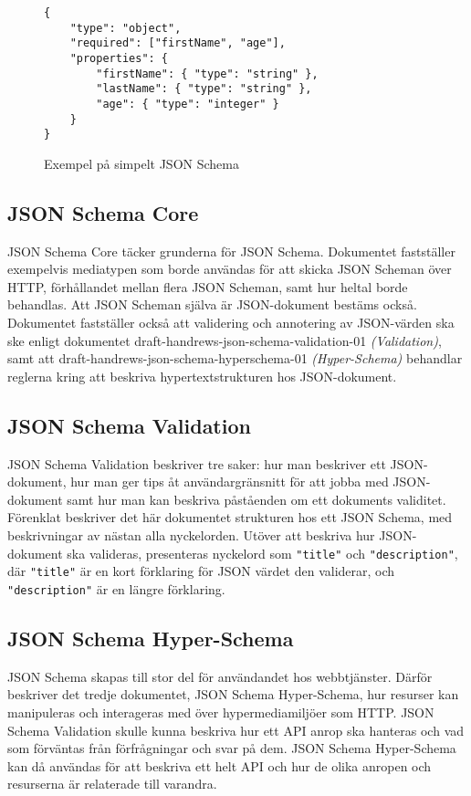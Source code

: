 \begin{figure}
	\begin{verbatim}
{
	"type": "object",
	"required": ["firstName", "age"],
	"properties": {
		"firstName": { "type": "string" },
		"lastName": { "type": "string" },
		"age": { "type": "integer" }
	}
}
	\end{verbatim}
	\vspace{-1.7em}
	\caption{Exempel på simpelt JSON Schema}
	\label{fig:json-schema-example}
\end{figure}

\subsection{JSON Schema Core}
JSON Schema Core täcker grunderna för JSON Schema. Dokumentet fastställer exempelvis mediatypen som borde användas för att skicka JSON Scheman över HTTP, förhållandet mellan flera JSON Scheman, samt hur heltal borde behandlas. Att JSON Scheman själva är JSON-dokument bestäms också. Dokumentet fastställer också att validering och annotering av JSON-värden ska ske enligt dokumentet draft-handrews-json-schema-validation-01 \textit{(Validation)}, samt att draft-handrews-json-schema-hyperschema-01 \textit{(Hyper-Schema)} behandlar reglerna kring att beskriva hypertextstrukturen hos JSON-dokument. \cite{A.Wright}

\subsection{JSON Schema Validation}
JSON Schema Validation beskriver tre saker: hur man beskriver ett JSON-dokument, hur man ger tips åt användargränsnitt för att jobba med JSON-dokument samt hur man kan beskriva påståenden om ett dokuments validitet. Förenklat beskriver det här dokumentet strukturen hos ett JSON Schema, med beskrivningar av nästan alla nyckelorden. Utöver att beskriva hur JSON-dokument ska valideras, presenteras nyckelord som \texttt{"title"} och \texttt{"description"}, där \texttt{"title"} är en kort förklaring för JSON värdet den validerar, och \texttt{"description"} är en längre förklaring. \cite{Andrews2018}

\subsection{JSON Schema Hyper-Schema}
JSON Schema skapas till stor del för användandet hos webbtjänster. Därför beskriver det tredje dokumentet, JSON Schema Hyper-Schema, hur resurser kan manipuleras och interageras med över hypermediamiljöer som HTTP. JSON Schema Validation skulle kunna beskriva hur ett API anrop ska hanteras och vad som förväntas från förfrågningar och svar på dem. JSON Schema Hyper-Schema kan då användas för att beskriva ett helt API och hur de olika anropen och resurserna är relaterade till varandra. \cite{Andrews2018a}

